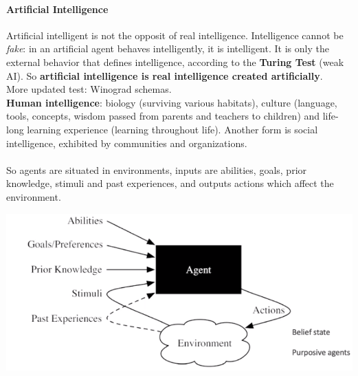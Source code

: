 \documentclass[10pt]{report}
\begin{document}
\paragraph{Artificial Intelligence} Artificial intelligent is not the opposit of real intelligence. Intelligence cannot be \textit{fake}: in an artificial agent behaves intelligently, it is intelligent. It is only the external behavior that defines intelligence, according to the \textbf{Turing Test} (weak AI). So \textbf{artificial intelligence is real intelligence created artificially}.\\
More updated test: Winograd schemas.\\
\textbf{Human intelligence}: biology (surviving various habitats), culture (language, tools, concepts, wisdom passed from parents and teachers to children) and life-long learning experience (learning throughout life). Another form is social intelligence, exhibited by communities and organizations.\\\\
So agents are situated in environments, inputs are abilities, goals, prior knowledge, stimuli and past experiences, and outputs actions which affect the environment.
\begin{center}
	\includegraphics[scale=0.5]{1.png}
\end{center}
\end{document}
